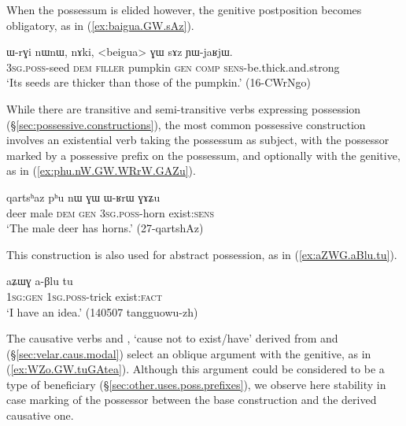 When the possessum is elided however, the genitive postposition becomes obligatory, as in (\ref{ex:baigua.GW.sAz}).

\begin{exe}
\ex \label{ex:baigua.GW.sAz}
\gll ɯ-rɣi nɯnɯ, nɤki, <beigua> ɣɯ sɤz ɲɯ-jaʁjɯ. \\
\textsc{3sg}.\textsc{poss}-seed \textsc{dem} \textsc{filler}  pumpkin \textsc{gen} \textsc{comp} \textsc{sens}-be.thick.and.strong \\
\glt `Its seeds are thicker than those of the pumpkin.' (16-CWrNgo) 
\end{exe}

While there are transitive and semi-transitive verbs expressing possession (§\ref{sec:possessive.constructions}), the most common possessive construction involves an existential verb taking the possessum as subject, with the possessor marked by a possessive prefix on the possessum, and optionally with the genitive, as in (\ref{ex:phu.nW.GW.WRrW.GAZu}). 

\begin{exe}
\ex \label{ex:phu.nW.GW.WRrW.GAZu}
\gll qartsʰaz pʰu nɯ ɣɯ ɯ-ʁrɯ ɣɤʑu \\
deer male \textsc{dem} \textsc{gen} \textsc{3sg}.\textsc{poss}-horn exist:\textsc{sens} \\
\glt `The male deer has horns.' (27-qartshAz)
\end{exe}

This construction is also used for abstract possession, as in (\ref{ex:aZWG.aBlu.tu}).

\begin{exe}
\ex \label{ex:aZWG.aBlu.tu}
\gll aʑɯɣ a-βlu tu \\
\textsc{1sg}:\textsc{gen} \textsc{1sg}.\textsc{poss}-trick exist:\textsc{fact} \\
\glt `I have an idea.' (140507 tangguowu-zh) 	
\end{exe}

The causative verbs  and , `cause not to exist/have' derived from  and  (§\ref{sec:velar.caus.modal}) select an oblique argument with the genitive, as in (\ref{ex:WZo.GW.tuGAtea}). Although this argument could be considered to be a type of beneficiary (§\ref{sec:other.uses.poss.prefixes}), we observe here stability in case marking of the possessor between the base construction and the derived causative one.

